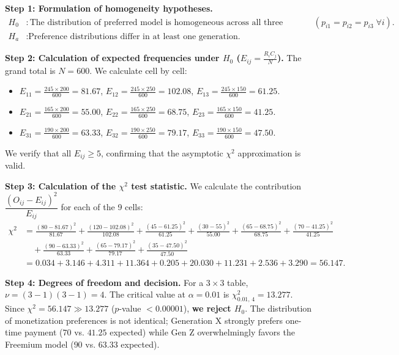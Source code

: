 \begin{solproblema}
	\textbf{Step 1: Formulation of homogeneity hypotheses.}
	\begin{align}
		H_0&: \text{The distribution of preferred model is homogeneous across all three generations } (p_{i1}=p_{i2}=p_{i3} \; \forall i). \\
		H_a&: \text{Preference distributions differ in at least one generation.}
	\end{align}
	
	\textbf{Step 2: Calculation of expected frequencies under $H_0$ ($E_{ij} = \frac{R_i C_j}{N}$).}
	The grand total is $N = 600$. We calculate cell by cell:
	\begin{itemize}
		\item $E_{11} = \frac{245 \times 200}{600} = 81.67$, \quad $E_{12} = \frac{245 \times 250}{600} = 102.08$, \quad $E_{13} = \frac{245 \times 150}{600} = 61.25$.
		\item $E_{21} = \frac{165 \times 200}{600} = 55.00$, \quad $E_{22} = \frac{165 \times 250}{600} = 68.75$, \quad $E_{23} = \frac{165 \times 150}{600} = 41.25$.
		\item $E_{31} = \frac{190 \times 200}{600} = 63.33$, \quad $E_{32} = \frac{190 \times 250}{600} = 79.17$, \quad $E_{33} = \frac{190 \times 150}{600} = 47.50$.
	\end{itemize}
	We verify that all $E_{ij} \geq 5$, confirming that the asymptotic $\chi^2$ approximation is valid.
	
	\textbf{Step 3: Calculation of the $\chi^2$ test statistic.}
	We calculate the contribution $\dfrac{(O_{ij}-E_{ij})^2}{E_{ij}}$ for each of the 9 cells:
	\begin{align}
		\chi^2 &= \frac{(80-81.67)^2}{81.67} + \frac{(120-102.08)^2}{102.08} + \frac{(45-61.25)^2}{61.25} + \frac{(30-55)^2}{55.00} + \frac{(65-68.75)^2}{68.75} + \frac{(70-41.25)^2}{41.25} \nonumber \\
		&\quad + \frac{(90-63.33)^2}{63.33} + \frac{(65-79.17)^2}{79.17} + \frac{(35-47.50)^2}{47.50} \\
		&= 0.034 + 3.146 + 4.311 + 11.364 + 0.205 + 20.030 + 11.231 + 2.536 + 3.290 = 56.147.
	\end{align}
	
	\textbf{Step 4: Degrees of freedom and decision.}
	For a $3 \times 3$ table, $\nu = (3-1)(3-1) = 4$. The critical value at $\alpha = 0.01$ is $\chi^2_{0.01, \, 4} = 13.277$.
	Since $\chi^2 = 56.147 \gg 13.277$ ($p$-value $< 0.00001$), \textbf{we reject $H_0$}. The distribution of monetization preferences is not identical; Generation X strongly prefers one-time payment ($70$ vs. $41.25$ expected) while Gen Z overwhelmingly favors the Freemium model ($90$ vs. $63.33$ expected).
\end{solproblema}

